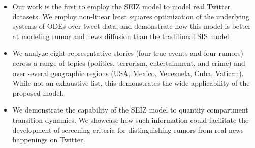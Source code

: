 \begin{itemize}
\item Our work is the first to employ the SEIZ model to model real Twitter
datasets. We employ non-linear least squares optimization of the underlying
systems of ODEs over
tweet data, and demonstrate how this model is better at modeling
rumor and news diffusion
than the traditional SIS model.
\item We analyze
eight representative stories (four true events and
four rumors) across a range of topics (politics, terrorism, entertainment, and crime) and over several
geographic regions (USA, Mexico, Venezuela, Cuba, Vatican). While not
an exhaustive list, this demonstrates the wide applicability of the
proposed model.
\item We demonstrate the capability of the SEIZ model to quantify
compartment transition dynamics. We showcase how such information
could facilitate the development of screening criteria for distinguishing rumors from real news happenings on Twitter.

\end{itemize}



